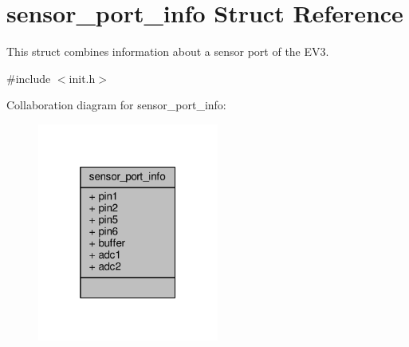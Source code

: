 \hypertarget{structsensor__port__info}{}\section{sensor\+\_\+port\+\_\+info Struct Reference}
\label{structsensor__port__info}


This struct combines information about a sensor port of the E\+V3.  




{\ttfamily \#include $<$init.\+h$>$}



Collaboration diagram for sensor\+\_\+port\+\_\+info\+:\nopagebreak
\begin{figure}[H]
\begin{center}
\leavevmode
\includegraphics[width=169pt]{structsensor__port__info__coll__graph}
\end{center}
\end{figure}
